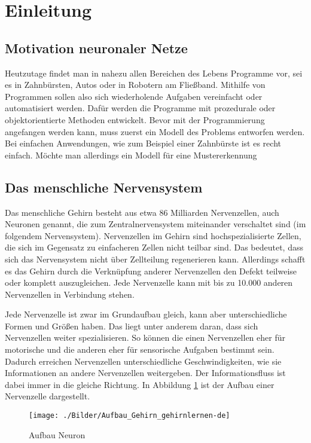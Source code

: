 \section{Einleitung}

\subsection{Motivation neuronaler Netze}
Heutzutage findet man in nahezu allen Bereichen des Lebens Programme vor, sei es in Zahnbürsten, Autos oder in Robotern am Fließband. Mithilfe von Programmen sollen also sich wiederholende Aufgaben vereinfacht oder automatisiert werden. Dafür werden die Programme mit prozedurale oder objektorientierte Methoden entwickelt. Bevor mit der Programmierung angefangen werden kann, muss zuerst ein Modell des Problems entworfen werden. Bei einfachen Anwendungen, wie zum Beispiel einer Zahnbürste ist es recht einfach. Möchte man allerdings ein Modell für eine Mustererkennung 

\subsection{Das menschliche Nervensystem}
Das menschliche Gehirn besteht aus etwa 86 Milliarden Nervenzellen, auch Neuronen genannt, die zum Zentralnervensystem miteinander verschaltet sind (im folgendem Nervensystem). Nervenzellen im Gehirn sind hochspezialisierte Zellen, die sich im Gegensatz zu einfacheren Zellen nicht teilbar sind. Das bedeutet, dass sich das Nervensystem nicht über Zellteilung regenerieren kann. Allerdings schafft es das Gehirn durch die Verknüpfung anderer Nervenzellen den Defekt teilweise oder komplett auszugleichen. Jede Nervenzelle kann mit bis zu 10.000 anderen Nervenzellen in Verbindung stehen. 

Jede Nervenzelle ist zwar im Grundaufbau gleich, kann aber unterschiedliche Formen und Größen haben. Das liegt unter anderem daran, dass sich Nervenzellen weiter spezialisieren. So können die einen Nervenzellen eher für motorische und die anderen eher für sensorische Aufgaben bestimmt sein. Dadurch erreichen Nervenzellen unterschiedliche Geschwindigkeiten, wie sie Informationen an andere Nervenzellen weitergeben. Der Informationsfluss ist dabei immer in die gleiche Richtung. In Abbildung \ref{AufbauNeuron} ist der Aufbau einer Nervenzelle dargestellt.

\begin{figure}[hbt]
	\centering
	\texttt{[image: ./Bilder/Aufbau\_Gehirn\_gehirnlernen-de]}
	\caption{Aufbau Neuron}
	\label{AufbauNeuron}
\end{figure}

